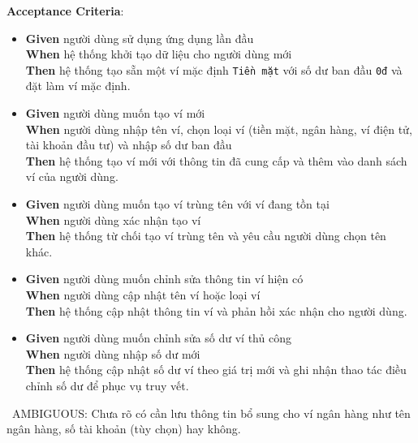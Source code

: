 \textbf{Acceptance Criteria}:

\begin{itemize}
\item \textbf{Given} người dùng sử dụng ứng dụng lần đầu  \\ \hspace*{1.5em}  \textbf{When} hệ thống khởi tạo dữ liệu cho người dùng mới  \\ \hspace*{1.5em}  \textbf{Then} hệ thống tạo sẵn một ví mặc định \texttt{Tiền mặt} với số dư ban đầu \texttt{0đ} và đặt làm ví mặc định.
\item \textbf{Given} người dùng muốn tạo ví mới  \\ \hspace*{1.5em}  \textbf{When} người dùng nhập tên ví, chọn loại ví (tiền mặt, ngân hàng, ví điện tử, tài khoản đầu tư) và nhập số dư ban đầu  \\ \hspace*{1.5em}  \textbf{Then} hệ thống tạo ví mới với thông tin đã cung cấp và thêm vào danh sách ví của người dùng.
\item \textbf{Given} người dùng muốn tạo ví trùng tên với ví đang tồn tại  \\ \hspace*{1.5em}  \textbf{When} người dùng xác nhận tạo ví  \\ \hspace*{1.5em}  \textbf{Then} hệ thống từ chối tạo ví trùng tên và yêu cầu người dùng chọn tên khác.
\item \textbf{Given} người dùng muốn chỉnh sửa thông tin ví hiện có  \\ \hspace*{1.5em}  \textbf{When} người dùng cập nhật tên ví hoặc loại ví  \\ \hspace*{1.5em}  \textbf{Then} hệ thống cập nhật thông tin ví và phản hồi xác nhận cho người dùng.
\item \textbf{Given} người dùng muốn chỉnh sửa số dư ví thủ công  \\ \hspace*{1.5em}  \textbf{When} người dùng nhập số dư mới  \\ \hspace*{1.5em}  \textbf{Then} hệ thống cập nhật số dư ví theo giá trị mới và ghi nhận thao tác điều chỉnh số dư để phục vụ truy vết.
\end{itemize}
\warningicon\  AMBIGUOUS: Chưa rõ có cần lưu thông tin bổ sung cho ví ngân hàng như tên ngân hàng, số tài khoản (tùy chọn) hay không.



